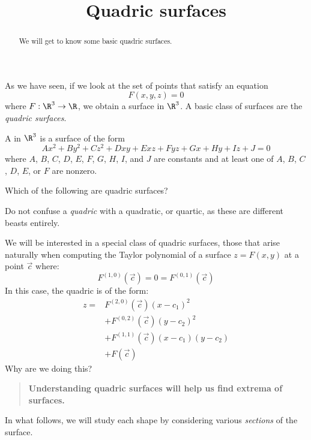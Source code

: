\documentclass{ximera}
\title[Dig-In:]{Quadric surfaces}
\begin{document}
\begin{abstract}
  We will get to know some basic quadric surfaces.
\end{abstract}
\maketitle

As we have seen, if we look at the set of points that satisfy an
equation
\[
F(x,y,z)=0
\]
where $F:\R^3\to\R$, we obtain a surface in $\R^3$. A basic class of
surfaces are the \textit{quadric surfaces}.

\begin{definition}
A  in $\R^3$ is a surface of the form
\[
Ax^2 + By^2 + Cz^2 + Dxy + Exz+ Fyz + Gx + Hy + I z + J = 0
\]
where $A$, $B$, $C$, $D$, $E$, $F$, $G$, $H$, $I$, and $J$ are
constants and at least one of $A$, $B$, $C$, $D$, $E$, or $F$ are
nonzero.
\end{definition}

\begin{question}
  Which of the following are quadric surfaces?
  \begin{selectAll}
  \end{selectAll}
\end{question}

\begin{warning}
  Do not confuse a \textit{quadric} with a quadratic, or quartic, as
  these are different beasts entirely.
\end{warning}

We will be interested in a special class of quadric surfaces, those
that arise naturally when computing the Taylor polynomial of a surface
$z=F(x,y)$ at a point $\vec{c}$ where:
\[
F^{(1,0)}(\vec{c}) = 0 = F^{(0,1)}(\vec{c})
\]
In this case, the quadric is of the form:
\begin{align*}
  z = &F^{(2,0)}(\vec{c})(x-c_1)^2 \\
  &+ F^{(0,2)}(\vec{c})(y-c_2)^2 \\
  &+ F^{(1,1)}(\vec{c}) (x-c_1)(y-c_2)\\
  &+ F(\vec{c})
\end{align*}
Why are we doing this?
\begin{quote}
  \textbf{Understanding quadric surfaces will help us find extrema of
    surfaces.}
\end{quote}

In what follows, we will study each shape by considering various
\textit{sections} of the surface.
\end{document}
